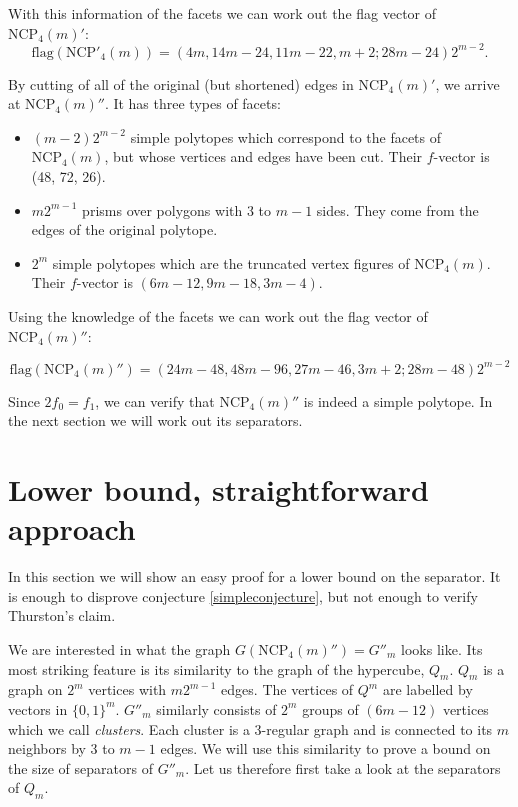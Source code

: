 \documentclass[a4paper,12pt]{book}
\theoremstyle{plain}
\theoremstyle{definition}
\newcommand\NC{\textrm{NCP}}
\begin{document}
With this information of the facets we can work out the flag vector of $\NC_4(m)'$:
\begin{equation}
 \textrm{flag}(\NC'_4(m)) = (4m, 14m-24, 11m-22, m+2; 28m-24)2^{m-2}.
\end{equation}

By cutting of all of the original (but shortened) edges in $\NC_4(m)'$, we arrive at 
$\NC_4(m)''$. It has three types of facets:

\begin{itemize}
 \item $(m-2)2^{m-2}$ simple polytopes which correspond to the facets of 
$\NC_4(m)$, but whose vertices and edges have been cut. Their $f$-vector is 
(48, 72, 26).
\item $m2^{m-1}$ prisms over polygons with $3$ to $m-1$ sides. They come from 
the edges of the original polytope.
\item $2^m$ simple polytopes which are the truncated vertex figures of 
$\NC_4(m)$. Their $f$-vector is $(6m - 12, 9m-18, 3m-4)$.
\end{itemize}

Using the knowledge of the facets we can work out the flag vector of 
$\NC_4(m)''$:

\begin{equation}
 \textrm{flag}(\NC_4(m)'') = (24m-48, 48m-96, 27m - 46, 3m+2; 28m -48)2^{m-2}
\end{equation}

Since $2f_0 = f_1$, we can verify that $\NC_4(m)''$ is indeed a simple 
polytope. In the next section we will work out its separators.

\section{Lower bound, straightforward approach}

In this section we will show an easy proof for a lower bound on the separator. It
is enough to disprove conjecture \ref{simpleconjecture}, but not enough to verify Thurston's
claim.

We are interested in what the graph $G(\NC_4(m)'') = G''_m$ looks like. Its 
most striking feature is its similarity to the graph of the hypercube, $Q_m$. 
$Q_m$ is a graph on $2^m$ vertices with $m2^{m-1}$ edges. The vertices of $Q^m$
are labelled by vectors in $\{0,1\}^m$. $G''_m$ 
similarly consists of $2^m$ groups of $(6m-12)$ vertices which we call 
\textit{clusters}. Each cluster is a 3-regular graph and is connected to its
$m$ neighbors by 3 to $m-1$ edges. We will use this similarity to 
prove a bound on the size of separators of $G''_m$. Let us therefore first take a 
look at the separators of $Q_m$.
\end{document}
